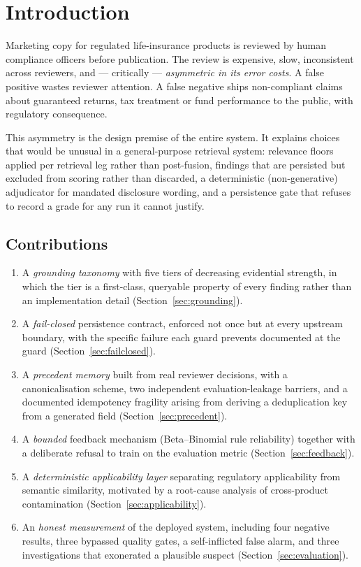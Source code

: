 \documentclass[10pt]{article}
\begin{document}
\section{Introduction}

Marketing copy for regulated life-insurance products is reviewed by human
compliance officers before publication. The review is expensive, slow,
inconsistent across reviewers, and --- critically --- \emph{asymmetric in its
error costs}. A false positive wastes reviewer attention. A false negative
ships non-compliant claims about guaranteed returns, tax treatment or fund
performance to the public, with regulatory consequence.

This asymmetry is the design premise of the entire system. It explains choices
that would be unusual in a general-purpose retrieval system: relevance floors
applied per retrieval leg rather than post-fusion, findings that are persisted
but excluded from scoring rather than discarded, a deterministic (non-generative)
adjudicator for mandated disclosure wording, and a persistence gate that refuses
to record a grade for any run it cannot justify.

\subsection{Contributions}

\begin{enumerate}
  \item A \emph{grounding taxonomy} with five tiers of decreasing evidential
        strength, in which the tier is a first-class, queryable property of
        every finding rather than an implementation detail
        (Section~\ref{sec:grounding}).
  \item A \emph{fail-closed} persistence contract, enforced not once but at
        every upstream boundary, with the specific failure each guard prevents
        documented at the guard (Section~\ref{sec:failclosed}).
  \item A \emph{precedent memory} built from real reviewer decisions, with a
        canonicalisation scheme, two independent evaluation-leakage barriers,
        and a documented idempotency fragility arising from deriving a
        deduplication key from a generated field (Section~\ref{sec:precedent}).
  \item A \emph{bounded} feedback mechanism (Beta--Binomial rule reliability)
        together with a deliberate refusal to train on the evaluation metric
        (Section~\ref{sec:feedback}).
  \item A \emph{deterministic applicability layer} separating regulatory
        applicability from semantic similarity, motivated by a root-cause
        analysis of cross-product contamination (Section~\ref{sec:applicability}).
  \item An \emph{honest measurement} of the deployed system, including four
        negative results, three bypassed quality gates, a self-inflicted false
        alarm, and three investigations that exonerated a plausible suspect
        (Section~\ref{sec:evaluation}).
\end{enumerate}
\end{document}
